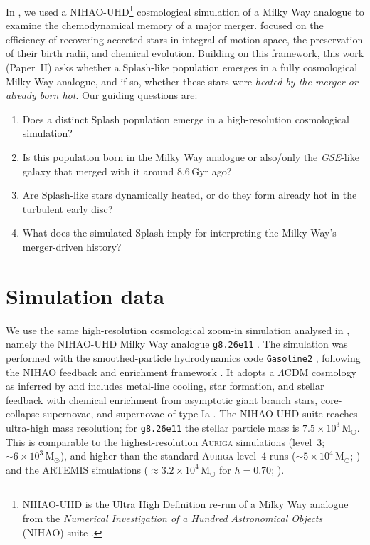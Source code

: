 \documentclass[fleqn,usenatbib]{mnras}
\begin{document}
In \citet[][hereafter Paper~I]{Buder2025c}, we used a NIHAO-UHD\footnote{NIHAO-UHD is the Ultra High Definition re-run of a Milky Way analogue from the \textit{Numerical Investigation of a Hundred Astronomical Objects} (NIHAO) suite \citep{Wang2015}.} cosmological simulation of a Milky Way analogue \citep{Buck2020, Buck2021} to examine the chemodynamical memory of a major merger.  focused on the efficiency of recovering accreted stars in integral-of-motion space, the preservation of their birth radii, and chemical evolution. Building on this framework, this work (Paper~II) asks whether a Splash-like population emerges in a fully cosmological Milky Way analogue, and if so, whether these stars were \emph{heated by the merger or already born hot}. Our guiding questions are:
\begin{enumerate}[leftmargin=2em,labelwidth=0em]
    \item Does a distinct Splash population emerge in a high-resolution cosmological simulation?
    \item Is this population born in the Milky Way analogue or also/only the \textit{GSE}-like galaxy that merged with it around $8.6\,\mathrm{Gyr}$ ago?
    \item Are Splash-like stars dynamically heated, or do they form already hot in the turbulent early disc?
    \item What does the simulated Splash imply for interpreting the Milky Way’s merger-driven history?
\end{enumerate}

\section{Simulation data}
\label{sec:data}

We use the same high-resolution cosmological zoom-in simulation analysed in , namely the NIHAO-UHD Milky Way analogue \texttt{g8.26e11} \citep{Wang2015, Buck2019b, Buck2020b, Buck2021}. The simulation was performed with the smoothed-particle hydrodynamics code \texttt{Gasoline2} \citep{Wadsley2017}, following the NIHAO feedback and enrichment framework \citep{Stinson2006, Stinson2013, Wang2015}. It adopts a $\Lambda$CDM cosmology as inferred by \citet{Planck2014} and includes metal-line cooling, star formation, and stellar feedback with chemical enrichment from asymptotic giant branch stars, core-collapse supernovae, and supernovae of type Ia \citep{Buck2021}. The NIHAO-UHD suite reaches ultra-high mass resolution; for \texttt{g8.26e11} the stellar particle mass is $7.5 \times 10^3\,\mathrm{M_{\odot}}$. This is comparable to the highest-resolution \textsc{Auriga} simulations (level~3; $\sim 6 \times 10^3\,\mathrm{M_{\odot}}$), and higher than the standard \textsc{Auriga} level~4 runs ($\sim 5 \times 10^4\,\mathrm{M_{\odot}}$; \citealt{Grand2017}) and the ARTEMIS simulations ($\approx 3.2 \times 10^4\,\mathrm{M_{\odot}}$ for $h=0.70$; \citealt{Font2020}).
\end{document}
